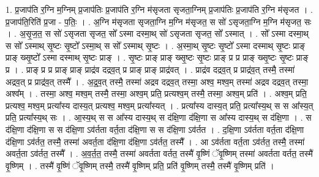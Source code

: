 \documentclass[17pt]{extarticle}
\begin{document}
1. प्र॒जाप॑ति र॒ग्नि म॒ग्निम् प्र॒जाप॑तिः प्र॒जाप॑ति र॒ग्नि म॑सृजता सृजता॒ग्निम् प्र॒जाप॑तिः प्र॒जाप॑ति र॒ग्नि म॑सृजत । . प्र॒जाप॑ति॒रिति॑ प्र॒जा - प॒तिः॒ । . अ॒ग्नि म॑सृजता सृजता॒ग्नि म॒ग्नि म॑सृजत॒ स सो॑ ऽसृजता॒ग्नि म॒ग्नि म॑सृजत॒ सः । . अ॒सृ॒ज॒त॒ स सो॑ ऽसृजता सृजत॒ सो᳚ ऽस्मा दस्मा॒थ् सो॑ ऽसृजता सृजत॒ सो᳚ ऽस्मात् । . सो᳚ ऽस्मा दस्मा॒थ् स सो᳚ ऽस्माथ् सृ॒ष्टः सृ॒ष्टो᳚ ऽस्मा॒थ् स सो᳚ ऽस्माथ् सृ॒ष्टः । . अ॒स्मा॒थ् सृ॒ष्टः सृ॒ष्टो᳚ ऽस्मा दस्माथ् सृ॒ष्टः प्राङ् प्राङ् ख्सृ॒ष्टो᳚ ऽस्मा दस्माथ् सृ॒ष्टः प्राङ् । . सृ॒ष्टः प्राङ् प्राङ् ख्सृ॒ष्टः सृ॒ष्टः प्राङ् प्र प्र प्राङ् ख्सृ॒ष्टः सृ॒ष्टः प्राङ् प्र । . प्राङ् प्र प्र प्राङ् प्राङ् प्राद्र॑व दद्रव॒त् प्र प्राङ् प्राङ् प्राद्र॑वत् । . प्राद्र॑व दद्रव॒त् प्र प्राद्र॑व॒त् तस्मै॒ तस्मा॑ अद्रव॒त् प्र प्राद्र॑व॒त् तस्मै᳚ । . अ॒द्र॒व॒त् तस्मै॒ तस्मा॑ अद्रव दद्रव॒त् तस्मा॒ अश्व॒ मश्व॒म् तस्मा॑ अद्रव दद्रव॒त् तस्मा॒ अश्व᳚म् । . तस्मा॒ अश्व॒ मश्व॒म् तस्मै॒ तस्मा॒ अश्व॒म् प्रति॒ प्रत्यश्व॒म् तस्मै॒ तस्मा॒ अश्व॒म् प्रति॑ । . अश्व॒म् प्रति॒ प्रत्यश्व॒ मश्व॒म् प्रत्या᳚स्य दास्य॒त् प्रत्यश्व॒ मश्व॒म् प्रत्या᳚स्यत् । . प्रत्या᳚स्य दास्य॒त् प्रति॒ प्रत्या᳚स्य॒थ् स स आ᳚स्य॒त् प्रति॒ प्रत्या᳚स्य॒थ् सः । . आ॒स्य॒थ् स स आ᳚स्य दास्य॒थ् स द॑क्षि॒णा द॑क्षि॒णा स आ᳚स्य दास्य॒थ् स द॑क्षि॒णा । . स द॑क्षि॒णा द॑क्षि॒णा स स द॑क्षि॒णा ऽव॑र्तता वर्त॒ता द॑क्षि॒णा स स द॑क्षि॒णा ऽव॑र्तत । . द॒क्षि॒णा ऽव॑र्तता वर्त॒ता द॑क्षि॒णा द॑क्षि॒णा ऽव॑र्तत॒ तस्मै॒ तस्मा॑ अवर्त॒ता द॑क्षि॒णा द॑क्षि॒णा ऽव॑र्तत॒ तस्मै᳚ । . आ ऽव॑र्तता वर्त॒ता ऽव॑र्तत॒ तस्मै॒ तस्मा॑ अवर्त॒ता ऽव॑र्तत॒ तस्मै᳚ । . अ॒व॒र्त॒त॒ तस्मै॒ तस्मा॑ अवर्तता वर्तत॒ तस्मै॑ वृ॒ष्णिं ॅवृ॒ष्णिम् तस्मा॑ अवर्तता वर्तत॒ तस्मै॑ वृ॒ष्णिम् । . तस्मै॑ वृ॒ष्णिं ॅवृ॒ष्णिम् तस्मै॒ तस्मै॑ वृ॒ष्णिम् प्रति॒ प्रति॑ वृ॒ष्णिम् तस्मै॒ तस्मै॑ वृ॒ष्णिम् प्रति॑ । \newline
\end{document}
